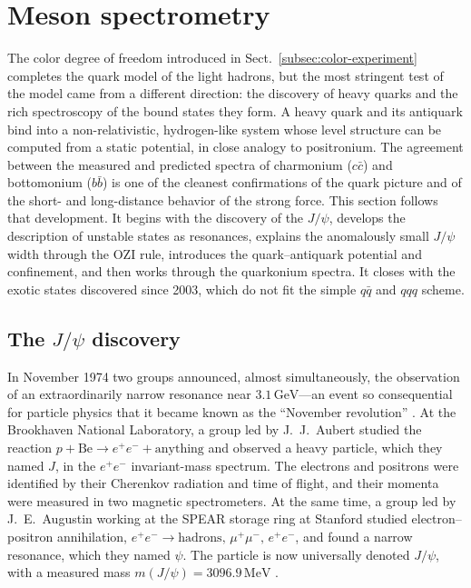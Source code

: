 \section{Meson spectrometry}
\label{sec:hadron-spectrometry}

The color degree of freedom introduced in Sect.~\ref{subsec:color-experiment} completes the
quark model of the light hadrons, but the most stringent test of the model came from a
different direction: the discovery of heavy quarks and the rich spectroscopy of the bound
states they form. A heavy quark and its antiquark bind into a non-relativistic,
hydrogen-like system whose level structure can be computed from a static potential, in
close analogy to positronium. The agreement between the measured and predicted spectra of
charmonium ($c\bar c$) and bottomonium ($b\bar b$) is one of the cleanest confirmations of
the quark picture and of the short- and long-distance behavior of the strong force. This
section follows that development. It begins with the discovery of the $J/\psi$, develops the
description of unstable states as resonances, explains the anomalously small $J/\psi$ width
through the OZI rule, introduces the quark--antiquark potential and confinement, and then
works through the quarkonium spectra. It closes with the exotic states discovered since
2003, which do not fit the simple $q\bar q$ and $qqq$ scheme.

\subsection{The \texorpdfstring{$J/\psi$}{J/psi} discovery}
\label{subsec:jpsi-discovery}

In November 1974 two groups announced, almost simultaneously, the observation of an
extraordinarily narrow resonance near $3.1\,\mathrm{GeV}$---an event so consequential for
particle physics that it became known as the ``November revolution''
\cite[Ch.~8]{Amsler2018}. At the Brookhaven National Laboratory, a group led by
J.~J.~Aubert studied the reaction $p + \mathrm{Be} \to e^+e^- + \text{anything}$ and
observed a heavy particle, which they named $J$, in the $e^+e^-$ invariant-mass spectrum.
The electrons and positrons were identified by their Cherenkov radiation and time of
flight, and their momenta were measured in two magnetic spectrometers. At the same time, a
group led by J.~E.~Augustin working at the SPEAR storage ring at Stanford studied
electron--positron annihilation, $e^+e^- \to \text{hadrons},\,\mu^+\mu^-,\,e^+e^-$, and
found a narrow resonance, which they named $\psi$. The particle is now universally
denoted $J/\psi$, with a measured mass $m(J/\psi) = 3096.9\,\mathrm{MeV}$
\cite[Ch.~8]{Amsler2018}.

